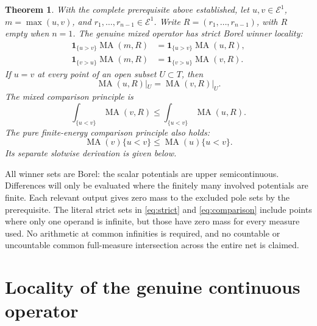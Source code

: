 \documentclass[11pt]{article}
\newtheorem{theorem}{Theorem}
\newcommand{\MA}{\operatorname{MA}}
\newcommand{\E}{\mathcal E}
\begin{document}
\begin{theorem}\label{thm:main}
With the complete prerequisite above established, let $u,v\in\E^1$,
$m=\max(u,v)$, and $r_1,\ldots,r_{n-1}\in\E^1$.
Write $R=(r_1,\ldots,r_{n-1})$, with $R$ empty when $n=1$.
The genuine mixed operator has strict Borel winner locality:
\begin{equation}\label{eq:strict}
 \begin{split}
 \mathbf1_{\{u>v\}}\MA(m,R)&=
                  \mathbf1_{\{u>v\}}\MA(u,R),\\
 \mathbf1_{\{v>u\}}\MA(m,R)&=
                  \mathbf1_{\{v>u\}}\MA(v,R).
 \end{split}
\end{equation}
If $u=v$ at every point of an open subset $U\subset T$, then
\begin{equation}\label{eq:open-local}
                  \MA(u,R)|_U=\MA(v,R)|_U.
\end{equation}
The mixed comparison principle is
\begin{equation}\label{eq:comparison}
 \int_{\{u<v\}}\MA(v,R)\leq
                    \int_{\{u<v\}}\MA(u,R).
\end{equation}
The pure finite-energy comparison principle also holds:
\[
                  \MA(v)\{u<v\}\leq\MA(u)\{u<v\}.
\]
Its separate slotwise derivation is given below.
\end{theorem}

All winner sets are Borel: the scalar potentials are upper
semicontinuous. Differences will only be evaluated where the finitely
many involved potentials are finite. Each relevant output gives
zero mass to the excluded pole sets by the prerequisite. The literal
strict sets in \eqref{eq:strict} and \eqref{eq:comparison} include
points where only one operand is infinite, but those have zero
mass for every measure used. No arithmetic at common infinities
is required, and no countable or uncountable common full-measure
intersection across the entire net is claimed.

\section{Locality of the genuine continuous operator}
\end{document}
